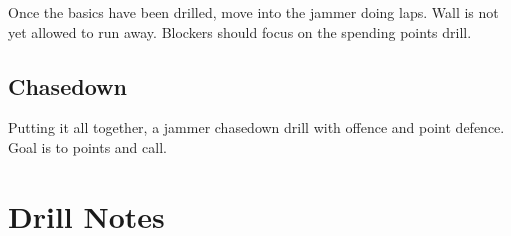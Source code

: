 \documentclass{journal}
\begin{document}
Once the basics have been drilled, move into the jammer doing laps.
Wall is not yet allowed to run away.
Blockers should focus on the spending points drill.

\subsection*{Chasedown}
Putting it all together, a jammer chasedown drill with offence and point defence. 
Goal is to points and call.

\pagebreak


\section*{Drill Notes}











\end{document}
